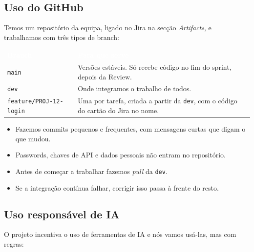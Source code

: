 \documentclass[11pt,a4paper]{article}
\newcommand{\th}[1]{\textcolor{white}{\sffamily\bfseries #1}}
\begin{document}
\subsection{Uso do GitHub}

Temos um repositório da equipa, ligado no Jira na secção \textit{Artifacts}, e trabalhamos com três tipos de branch:

\small
\renewcommand{\arraystretch}{1.5}
\begin{tabularx}{\textwidth}{N{4.9cm} Y}
   \th{Branch} & \th{Para que serve} \\
   \texttt{main} & Versões estáveis. Só recebe código no fim do sprint, depois da Review. \\
   \texttt{dev} & Onde integramos o trabalho de todos. \\
   \texttt{feature/PROJ-12-login} & Uma por tarefa, criada a partir da \texttt{dev}, com o código do cartão do Jira no nome. \\
  \bottomrule
\end{tabularx}
\renewcommand{\arraystretch}{1}
\normalsize

\begin{itemize}
  \item Fazemos commits pequenos e frequentes, com mensagens curtas que digam o que mudou.
  \item Passwords, chaves de API e dados pessoais não entram no repositório.
  \item Antes de começar a trabalhar fazemos \textit{pull} da \texttt{dev}.
  \item Se a integração contínua falhar, corrigir isso passa à frente do resto.
\end{itemize}

\subsection{Uso responsável de IA}

O projeto incentiva o uso de ferramentas de IA e nós vamos usá-las, mas com regras:
\end{document}
